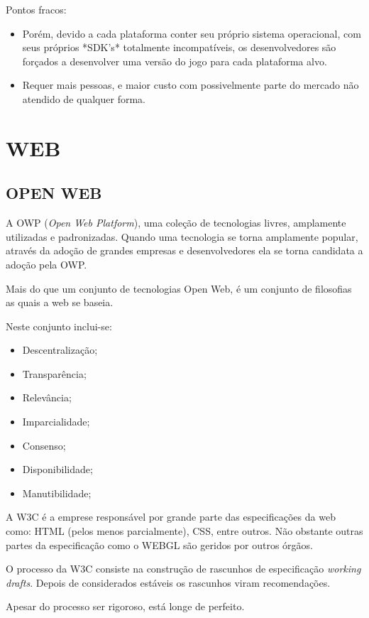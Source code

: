 \documentclass[
12pt,
a4paper,
portuges,
draft
]{report}
\begin{document}
Pontos fracos:
\begin{itemize}
\item Porém, devido a cada plataforma conter seu próprio sistema operacional,
com seus próprios *SDK's* totalmente incompatíveis, os desenvolvedores são
forçados a desenvolver uma versão do jogo para cada plataforma alvo.
\item Requer mais pessoas, e maior custo com possivelmente parte do mercado não atendido de qualquer forma.
\end{itemize}

\section{WEB}

\subsection{OPEN WEB}

A OWP (\textit{Open Web Platform}), uma coleção de tecnologias livres,
amplamente utilizadas e padronizadas.
Quando uma tecnologia se torna amplamente popular, através da
adoção de grandes empresas e desenvolvedores ela se torna candidata a
adoção pela OWP.

Mais do que um conjunto de tecnologias Open Web, é um conjunto de
filosofias as quais a web se baseia.

Neste conjunto inclui-se:

\begin{itemize}
\item Descentralização;
\item Transparência;
\item Relevância;
\item Imparcialidade;
\item Consenso;
\item Disponibilidade;
\item Manutibilidade;
\end{itemize}

A W3C é a emprese responsável por grande parte das especificações da web como: HTML (pelos menos parcialmente), CSS, entre outros. Não obstante outras partes da especificação como o WEBGL são geridos por outros órgãos.

O processo da W3C consiste na construção de rascunhos de especificação \textit{working drafts}. Depois de considerados estáveis os rascunhos viram recomendações.

Apesar do processo ser rigoroso, está longe de perfeito.
\end{document}

